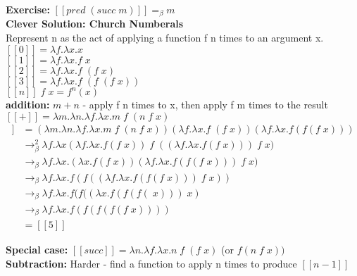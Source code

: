 \documentclass[11pt]{article}
\begin{document}
{\bf Exercise:} $[[pred\;(succ\;m)]] =_\beta m$ \\

\textbf{Clever Solution: Church Numberals} \\

Represent n as the act of applying a function f n times to an argument x. \\

$[[0]] = \lambda f.\lambda x.x$ \\

$[[1]] = \lambda f.\lambda x.f\;x$\\

$[[2]] = \lambda f.\lambda x.f\;(f\;x)$\\

$[[3]] = \lambda f.\lambda x.f\;(f\;(f\;x))$\\

$[[n]]\;f\;x = f^n(x)$ \\

{\bf addition:} $m + n$ - apply f n times to x, then apply f m times to the result \\

$[[+]] = \lambda m.\lambda n.\lambda f.\lambda x.m\;f\;(n\;f\;x)$ \\

\begin{align*}
[[+\;2\;3]] &= (\lambda m.\lambda n.\lambda f.\lambda x.m\;f\;(n\;f\;x))(\lambda f.\lambda x.f\;(f\;x))(\lambda f.\lambda x.f(f(f\;x))) \\
&\rightarrow_\beta^2 \lambda f.\lambda x(\lambda f.\lambda x.f(f\;x))\;f\;((\lambda f.\lambda x.f(f\;x)))\;f\;x) \\
&\rightarrow_\beta \lambda f.\lambda x.(\lambda x.f(f\;x))(\lambda f.\lambda x.f(f(f\;x)))\;f\;x) \\
&\rightarrow_\beta \lambda f.\lambda x.f(f((\lambda f.\lambda x.f(f(f\;x)))\;f\;x)) \\
&\rightarrow_\beta \lambda f.\lambda x.f(f((\lambda x.f(f(f(\;x)))\;x) \\
&\rightarrow_\beta \lambda f.\lambda x.f(f(f(f(f\;x)))) \\
&= [[5]]
\end{align*}

{\bf Special case:} $[[succ]] = \lambda n.\lambda f.\lambda x.n\;f\;(f\;x)$ (or $f(n\;f\;x))$ \\

\textbf{Subtraction:} Harder - find a function to apply n times to produce $[[n-1]]$ \\
\end{document}
